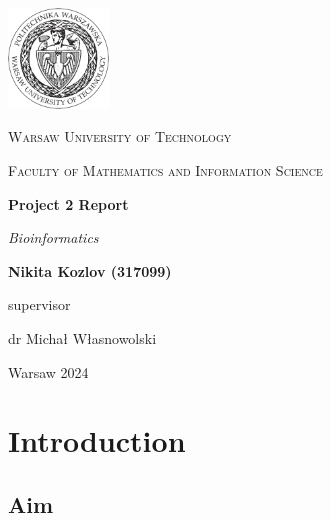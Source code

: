 \documentclass[11pt, a4paper, hidelinks]{article}
\begin{document}
\begin{titlepage}
    \centering
    \vspace*{0.5 cm}
    \includegraphics[width=0.20\textwidth]{logo.png}\par\vspace{1cm}
    {\scshape\LARGE Warsaw University of Technology \par}
    \vspace{1cm}
    {\scshape\Large Faculty of Mathematics and Information Science\par}
    \vspace{1.5cm}
    {\huge\bfseries Project 2 Report\par}
    \vspace{1cm}
    {\Large\itshape Bioinformatics\par}
    \vfill
    \begin{flushright}

    {\Large\bfseries Nikita Kozlov (317099)\par}
    \vfill
    {supervisor\par}
    {\Large dr Michał Własnowolski \par}

    \end{flushright}
    \vfill
    {\large Warsaw 2024\par}
    \vspace{1cm}
\end{titlepage}

\tableofcontents

\newpage

\section{Introduction}\label{sec:introduction}

\subsection{Aim}\label{subsec:aim}
\end{document}
